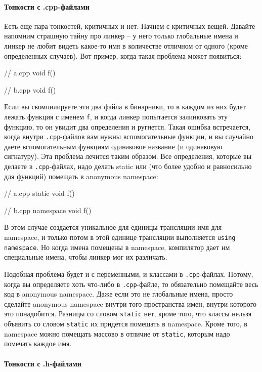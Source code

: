 \paragraph{Тонкости с .cpp-файлами}

Есть еще пара тонкостей, критичных и нет.
Начнем с критичных вещей.
Давайте напомним страшную тайну про линкер -- у него только глобальные имена и линкер не любит видеть какое-то имя в количестве отличном от одного (кроме определенных случаев).
Вот пример, когда такая проблема может появиться:
\begin{cppcode}
// a.cpp
void f() {}

// b.cpp
void f() {}
\end{cppcode}
Если вы скомпилируете эти два файла в бинарники, то в каждом из них будет лежать функция с именем \verb"f", и когда линкер попытается залинковать эту функцию, то он увидит два определения и ругнется.
Такая ошибка встречается, когда внутри \verb".cpp"-файлов вам нужны вспомогательные функции, и вы случайно даете вспомогательным функциям одинаковое название (и одинаковую сигнатуру).
Эта проблема лечится таким образом.
Все определения, которые вы делаете в \verb".cpp"-файлах, надо делать static или (что более удобно и равносильно для функций) помещать в anonymous namespace:
\begin{cppcode}
// a.cpp
static void f() {}

// b.cpp
namespace {
void f() {}
}
\end{cppcode}
В этом случае создается уникальное для единицы трансляции имя для namespace, и только потом в этой единице трансляции выполняется \verb"using namespace".
Но когда имена помещены в namespace, компилятор дает им специальные имена, чтобы линкер мог их различать.

Подобная проблема будет и с переменными, и классами в \verb".cpp"-файлах.
Потому, когда вы определяете хоть что-либо в \verb".cpp"-файле, то обязательно помещайте весь код в anonymous namespace.
Даже если это не глобальные имена, просто сделайте anonymous namespace внутри того пространства имен, внутри которого это понадобится.
Разницы со словом \verb"static" нет, кроме того, что классы нельзя объявить со словом \verb"static" их придется помещать в namespace.
Кроме того, в namespace можно помещать массово в отличие от \verb"static", которым надо помечать каждое имя.

\paragraph{Тонкости с .h-файлами}

